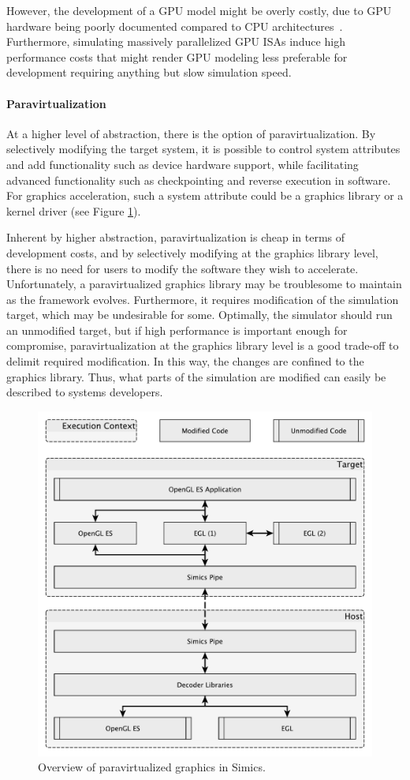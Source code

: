 However, the development of a GPU model might be overly costly, due to GPU hardware being poorly documented compared to CPU architectures~.
Furthermore, simulating massively parallelized GPU ISAs induce high performance costs that might render GPU modeling less preferable for development requiring anything but slow simulation speed.

\paragraph{Paravirtualization}
\label{par:previousresearch_graphicsvirtualization_paravirtualization}
At a higher level of abstraction, there is the option of paravirtualization.
By selectively modifying the target system, it is possible to control system attributes and add functionality such as device hardware support, while facilitating advanced functionality such as checkpointing and reverse execution in software.
For graphics acceleration, such a system attribute could be a graphics library or a kernel driver (see Figure \ref{fig:overview}).

Inherent by higher abstraction, paravirtualization is cheap in terms of development costs, and by selectively modifying at the graphics library level, there is no need for users to modify the software they wish to accelerate.
Unfortunately, a paravirtualized graphics library may be troublesome to maintain as the framework evolves.
Furthermore, it requires modification of the simulation target, which may be undesirable for some.
Optimally, the simulator should run an unmodified target, but if high performance is important enough for compromise, paravirtualization at the graphics library level is a good trade-off to delimit required modification.
In this way, the changes are confined to the graphics library.
Thus, what parts of the simulation are modified can easily be described to systems developers.

\begin{figure}
\centering
\includegraphics[width=\linewidth]{img/yedoverview.pdf}
\caption{Overview of paravirtualized graphics in Simics.}
\label{fig:overview}
\end{figure}
